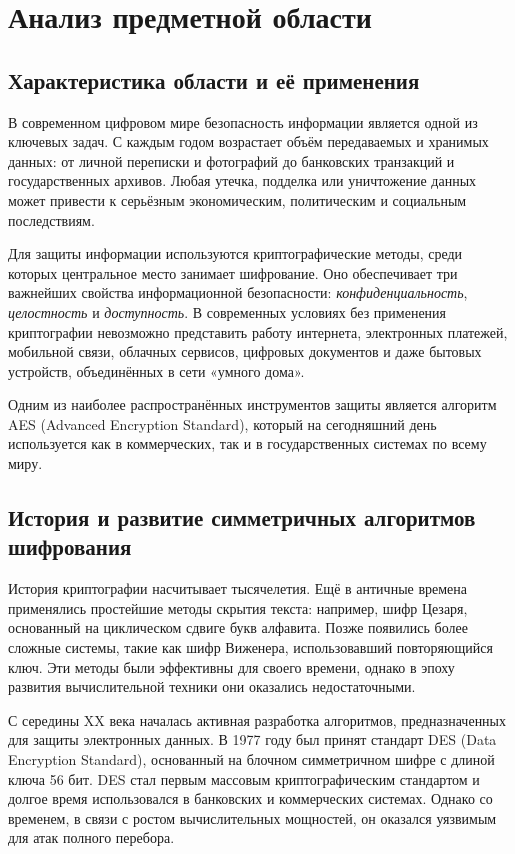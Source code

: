 \section{Анализ предметной области}
\subsection{Характеристика области и её применения}

В современном цифровом мире безопасность информации является одной из ключевых задач. С каждым годом возрастает объём передаваемых и хранимых данных: от личной переписки и фотографий до банковских транзакций и государственных архивов. Любая утечка, подделка или уничтожение данных может привести к серьёзным экономическим, политическим и социальным последствиям.  

Для защиты информации используются криптографические методы, среди которых центральное место занимает шифрование. Оно обеспечивает три важнейших свойства информационной безопасности: \textit{конфиденциальность}, \textit{целостность} и \textit{доступность}. В современных условиях без применения криптографии невозможно представить работу интернета, электронных платежей, мобильной связи, облачных сервисов, цифровых документов и даже бытовых устройств, объединённых в сети «умного дома».  

Одним из наиболее распространённых инструментов защиты является алгоритм AES (Advanced Encryption Standard), который на сегодняшний день используется как в коммерческих, так и в государственных системах по всему миру.  

\subsection{История и развитие симметричных алгоритмов шифрования}

История криптографии насчитывает тысячелетия. Ещё в античные времена применялись простейшие методы скрытия текста: например, шифр Цезаря, основанный на циклическом сдвиге букв алфавита. Позже появились более сложные системы, такие как шифр Виженера, использовавший повторяющийся ключ. Эти методы были эффективны для своего времени, однако в эпоху развития вычислительной техники они оказались недостаточными.  

С середины XX века началась активная разработка алгоритмов, предназначенных для защиты электронных данных. В 1977 году был принят стандарт DES (Data Encryption Standard), основанный на блочном симметричном шифре с длиной ключа 56 бит. DES стал первым массовым криптографическим стандартом и долгое время использовался в банковских и коммерческих системах. Однако со временем, в связи с ростом вычислительных мощностей, он оказался уязвимым для атак полного перебора.  

